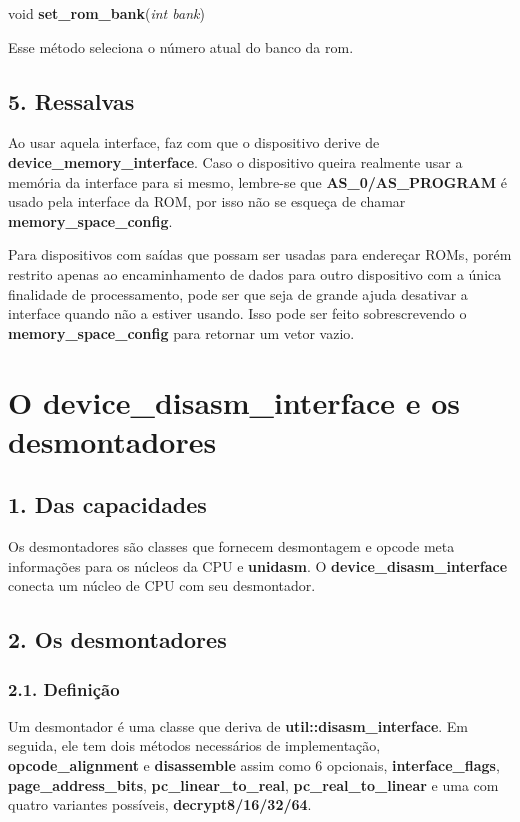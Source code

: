 \documentclass[letterpaper,10pt,brazil]{sphinxmanual}
\begin{document}
\begin{DUlineblock}{0em}
\item[] void \textbf{set\_rom\_bank}(\emph{int bank})
\end{DUlineblock}

Esse método seleciona o número atual do banco da rom.


\subsection{5. Ressalvas}
\label{techspecs/device_rom_interface:ressalvas}
Ao usar aquela interface, faz com que o dispositivo derive de
\textbf{device\_memory\_interface}. Caso o dispositivo queira realmente usar a
memória da interface para si mesmo, lembre-se que \textbf{AS\_0/AS\_PROGRAM} é
usado pela interface da ROM, por isso não se esqueça de chamar
\textbf{memory\_space\_config}.

Para dispositivos com saídas que possam ser usadas para endereçar
ROMs, porém restrito apenas ao encaminhamento de dados para outro
dispositivo com a única finalidade de processamento, pode ser que seja
de grande ajuda desativar a interface quando não a estiver usando.
Isso pode ser feito sobrescrevendo o \textbf{memory\_space\_config} para
retornar um vetor vazio.


\section{O device\_disasm\_interface e os desmontadores}
\label{techspecs/device_disasm_interface:o-device-disasm-interface-e-os-desmontadores}\label{techspecs/device_disasm_interface::doc}

\subsection{1. Das capacidades}
\label{techspecs/device_disasm_interface:das-capacidades}
Os desmontadores são classes que fornecem desmontagem e opcode
meta informações para os núcleos da CPU e \textbf{unidasm}. O
\textbf{device\_disasm\_interface} conecta um núcleo de CPU com seu
desmontador.


\subsection{2. Os desmontadores}
\label{techspecs/device_disasm_interface:os-desmontadores}

\subsubsection{2.1. Definição}
\label{techspecs/device_disasm_interface:definicao}
Um desmontador é uma classe que deriva de \textbf{util::disasm\_interface}.
Em seguida, ele tem dois métodos necessários de implementação,
\textbf{opcode\_alignment} e \textbf{disassemble} assim como 6 opcionais,
\textbf{interface\_flags}, \textbf{page\_address\_bits}, \textbf{pc\_linear\_to\_real},
\textbf{pc\_real\_to\_linear} e uma com quatro variantes possíveis,
\textbf{decrypt8/16/32/64}.
\end{document}
